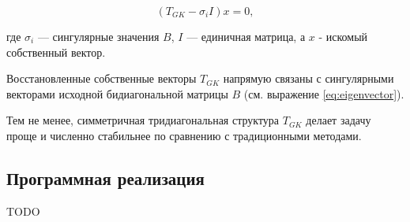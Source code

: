 \begin{equation}
( T_{GK} - \sigma_i I )x = 0,
\end{equation}

где \( \sigma_i \) — сингулярные значения \( B \), \( I \) — единичная матрица, а \(x\) - искомый собственный вектор.

Восстановленные собственные векторы \( T_{GK} \) напрямую связаны с сингулярными векторами исходной бидиагональной матрицы \( B \) (см. выражение \eqref{eq:eigenvector}).

Тем не менее, симметричная тридиагональная структура \( T_{GK} \) делает задачу проще и численно стабильнее по сравнению с традиционными методами.



\subsection{Программная реализация}

TODO



